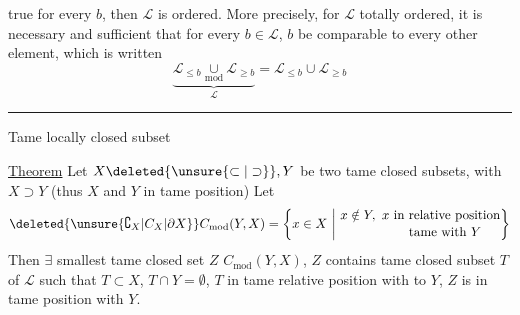 true for every $b$, then $\mathcal L$ is  ordered. More precisely, for $\mathcal L$ totally ordered, it is necessary and sufficient that for every $b\in\mathcal L$, $b$ be comparable to every other element, which is written
\[
\underbrace{\mathcal L_{\leq b}\underset{\mathrm{mod}}{\cup}\mathcal L_{\geq b}}_{\mathcal L}=\mathcal L_{\leq b}\cup \mathcal L_{\geq b}
\]
\begin{center}\rule{2.5cm}{0.35pt}\end{center}

Tame locally closed subset

\uline{Theorem} Let $X\deleted{\unsure{\subset|\supset}},Y$ be two tame closed subsets, with $X\supset Y$ (thus $X$ and $Y$ in tame  position)
 
Let
\[
\deleted{\unsure{\complement_X|C_X|\partial X}} C_{\mathrm{mod}}(Y,X)=\left\{x\in X\ \middle|\ 
\begin{aligned}&x\notin Y,\ x\text{ in relative position}\\[-2pt]&\hphantom{x\notin Y,\ x\text{ in }}\text{tame with }Y\end{aligned}\right\}
\]
Then $\exists$ smallest tame closed set $Z$    $C_{\mathrm{mod}}(Y,X)$,  $Z$  contains  tame closed subset $T$ of $\mathcal L$ such that $T\subset X$, $T\cap Y=\emptyset$, $T$ in tame relative position with  to $Y$,  $Z$ is in tame position with $Y$.

